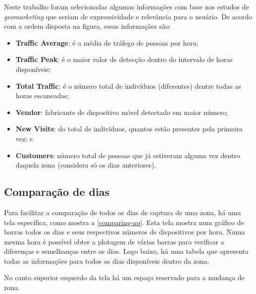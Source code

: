 Neste trabalho foram selecionadas algumas informações com base nos estudos de \emph{geomarketing} que seriam
de expressividade e relevância para o usuário. De acordo com a ordem disposta
na figura, essas informações são:

\begin{itemize}
    \item \textbf{Traffic Average}: é a média de tráfego de pessoas por hora;
    \item \textbf{Traffic Peak}: é o maior valor de detecção dentro do intervalo de horas disponíveis;
    \item \textbf{Total Traffic}: é o número total de indivíduos (diferentes) dentre todas as horas escaneadas;
    \item \textbf{Vendor}: fabricante de dispositivo móvel detectado em maior número;
    \item \textbf{New Visits}: do total de indivíduos, quantos estão presentes pela primeira vez; e
    \item \textbf{Customers}: número total de pessoas que já estiveram alguma vez dentro daquela zona (considera só os dias anteriores).
\end{itemize}

\subsection{Comparação de dias}
Para facilitar a comparação de todos os dias de captura de uma zona, há uma tela
específica, como mostra a \autoref{comparing-ap}. Esta tela mostra num
gráfico de barras todos os dias e seus respectivos números de dispositivos por
hora. Numa mesma hora é possível obter a plotagem de várias barras para verificar
a diferenças e semelhanças entre os dias. Logo baixo, há uma tabela que
apresenta todas as informações para todos os dias disponíveis dentro da zona.

No canto superior esquerdo da tela há um espaço reservado para a mudança de zona.

